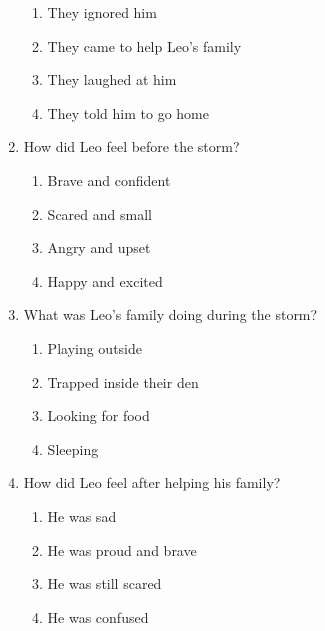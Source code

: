 \documentclass[12pt]{article}
\begin{document}
\begin{enumerate}
    \begin{enumerate}[label=\Alph*.]
        \item They ignored him
        \item They came to help Leo's family
        \item They laughed at him
        \item They told him to go home
    \end{enumerate}

    \vspace{0.5cm}

    \item How did Leo feel before the storm?

    \begin{enumerate}[label=\Alph*.]
        \item Brave and confident
        \item Scared and small
        \item Angry and upset
        \item Happy and excited
    \end{enumerate}

    \vspace{0.5cm}

    \item What was Leo's family doing during the storm?

    \begin{enumerate}[label=\Alph*.]
        \item Playing outside
        \item Trapped inside their den
        \item Looking for food
        \item Sleeping
    \end{enumerate}

    \vspace{0.5cm}

    \item How did Leo feel after helping his family?

    \begin{enumerate}[label=\Alph*.]
        \item He was sad
        \item He was proud and brave
        \item He was still scared
        \item He was confused
    \end{enumerate}


\end{enumerate}
\end{document}
